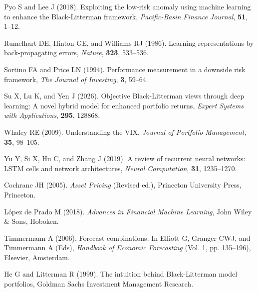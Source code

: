 \documentclass[eng]{kjas3}
\begin{document}
\begin{reference}
Pyo S and Lee J (2018).
Exploiting the low-risk anomaly using machine learning to enhance the Black-Litterman framework,
\textit{Pacific-Basin Finance Journal}, \textbf{51}, 1--12.

Rumelhart DE, Hinton GE, and Williams RJ (1986).
Learning representations by back-propagating errors,
\textit{Nature}, \textbf{323}, 533--536.

Sortino FA and Price LN (1994).
Performance measurement in a downside risk framework,
\textit{The Journal of Investing}, \textbf{3}, 59--64.

Su X, Lu K, and Yen J (2026).
Objective Black-Litterman views through deep learning: A novel hybrid model for enhanced portfolio returns,
\textit{Expert Systems with Applications}, \textbf{295}, 128868.

Whaley RE (2009).
Understanding the VIX,
\textit{Journal of Portfolio Management}, \textbf{35}, 98--105.

Yu Y, Si X, Hu C, and Zhang J (2019).
A review of recurrent neural networks: LSTM cells and network architectures,
\textit{Neural Computation}, \textbf{31}, 1235--1270.

%
%
Cochrane JH (2005).
\textit{Asset Pricing} (Revised ed.), Princeton University Press, Princeton.

L\'opez de Prado M (2018).
\textit{Advances in Financial Machine Learning}, John Wiley \& Sons, Hoboken.

%
%
Timmermann A (2006).
Forecast combinations. In Elliott G, Granger CWJ, and Timmermann A (Eds),
\textit{Handbook of Economic Forecasting} (Vol. 1, pp. 135--196), Elsevier, Amsterdam.

%
%
He G and Litterman R (1999).
The intuition behind Black-Litterman model portfolios,
Goldman Sachs Investment Management Research.

\end{reference}



\end{document}
